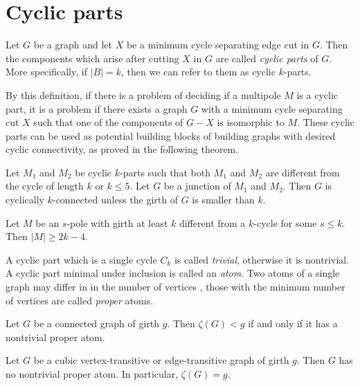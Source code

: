 \documentclass[12pt, twoside]{book}
\begin{document}
\section{Cyclic parts}\label{sec:cyclic-parts}

\begin{definition}
	Let $G$ be a graph and let $X$ be a minimum cycle separating edge cut in $G$. Then the components which arise after cutting $X$ in $G$ are called \textit{cyclic parts} of $G$. More specifically, if $|B|=k$, then we can refer to them as cyclic $k$-parts.
\end{definition}

By this definition, if there is a problem of deciding if a multipole $M$ is a cyclic part, it is a problem if there exists a graph $G$ with a minimum cycle separating cut $X$ such that one of the components of $G-X$ is isomorphic to $M$. These cyclic parts can be used as potential building blocks of building graphs with desired cyclic connectivity, as proved in the following theorem.

\begin{theorem}
	Let $M_1$ and $M_2$ be cyclic $k$-parts such that both $M_1$ and $M_2$ are diﬀerent from the cycle of length $k$ or $k\leq 5$. Let $G$ be a junction of $M_1$ and $M_2$. Then $G$ is cyclically $k$-connected unless the girth of $G$ is smaller than $k$.
\end{theorem}

\begin{lemma}\label{lem:rajnik5.1}
	Let $M$ be an $s$-pole with girth at least $k$ different from a $k$-cycle for some $s\leq k$. Then $|M| \geq 2k - 4$.
\end{lemma}

A cyclic part which is a single cycle $C_k$ is called \textit{trivial}, otherwise it is nontrivial. A cyclic part minimal under inclusion is called an \textit{atom}. Two atoms of a single graph may differ in in the number of vertices \cite{atoms-of-cyclic}, those with the minimum number of vertices are called \textit{proper} atoms.

\begin{proposition}
	Let $G$ be a connected graph of girth $g$. Then $\zeta(G)<g$ if and only if it has a nontrivial proper atom.
\end{proposition}

\begin{theorem}\label{th:cyclic-connectivity-of-transitive}
	Let $G$ be a cubic vertex-transitive or edge-transitive graph of girth $g$. Then $G$ has no nontrivial proper atom. In particular, $\zeta(G) = g$.
\end{theorem}
\end{document}
